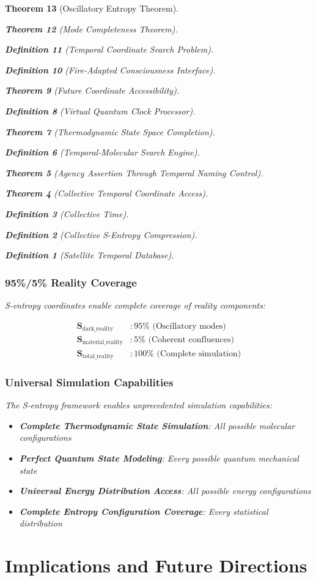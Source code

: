 \documentclass[12pt,a4paper]{article}
\newtheorem{theorem}{Theorem}[section]
\newtheorem{definition}[theorem]{Definition}
\begin{document}
\begin{theorem}[Oscillatory Entropy Theorem]
\begin{theorem}[Mode Completeness Theorem]
\begin{enumerate}
\begin{definition}[Temporal Coordinate Search Problem]
\begin{algorithm}
\begin{definition}[Fire-Adapted Consciousness Interface]
\begin{theorem}[Future Coordinate Accessibility]
\begin{definition}[Virtual Quantum Clock Processor]
\begin{itemize}
\begin{itemize}
\begin{theorem}[Thermodynamic State Space Completion]
\begin{definition}[Temporal-Molecular Search Engine]
\begin{theorem}[Agency Assertion Through Temporal Naming Control]
\begin{remark}
\begin{theorem}[Collective Temporal Coordinate Access]
\begin{definition}[Collective Time]
\begin{definition}[Collective S-Entropy Compression]
\begin{definition}[Satellite Temporal Database]
\begin{algorithm}
\begin{table}[h]
{{\subsubsection{95\%/5\% Reality Coverage}

S-entropy coordinates enable complete coverage of reality components:

\begin{align}
\mathbf{S}_{\text{dark\_reality}} &: 95\% \text{ (Oscillatory modes)} \\
\mathbf{S}_{\text{material\_reality}} &: 5\% \text{ (Coherent confluences)} \\
\mathbf{S}_{\text{total\_reality}} &: 100\% \text{ (Complete simulation)}
\end{align}

\subsubsection{Universal Simulation Capabilities}

The S-entropy framework enables unprecedented simulation capabilities:

\begin{itemize}
\item \textbf{Complete Thermodynamic State Simulation}: All possible molecular configurations
\item \textbf{Perfect Quantum State Modeling}: Every possible quantum mechanical state
\item \textbf{Universal Energy Distribution Access}: All possible energy configurations
\item \textbf{Complete Entropy Configuration Coverage}: Every statistical distribution
\end{itemize}

\section{Implications and Future Directions}

}}
\end{table}
\end{algorithm}
\end{definition}
\end{definition}
\end{definition}
\end{theorem}
\end{remark}
\end{theorem}
\end{definition}
\end{theorem}
\end{itemize}
\end{itemize}
\end{definition}
\end{theorem}
\end{definition}
\end{algorithm}
\end{definition}
\end{enumerate}
\end{theorem}
\end{theorem}
\end{document}
